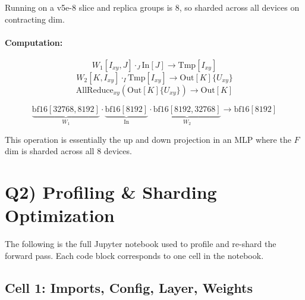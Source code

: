 \documentclass[11pt]{article}
\begin{document}
Running on a v5e-8 slice and replica groups is 8, so sharded across all devices on contracting dim.

\paragraph{Computation:}
\[
W_1[I_{xy}, J] \cdot_J \text{In}[J] \to \text{Tmp}[I_{xy}]
\]
\[
W_2[K, I_{xy}] \cdot_I \text{Tmp}[I_{xy}] \to \text{Out}[K]\{U_{xy}\}
\]
\[
\text{AllReduce}_{xy}(\text{Out}[K]\{U_{xy}\}) \to \text{Out}[K]
\]

\[
\underbrace{\text{bf16}[32768, 8192]}_{W_1} \cdot \underbrace{\text{bf16}[8192]}_{\text{In}} \cdot \underbrace{\text{bf16}[8192, 32768]}_{W_2} \to \text{bf16}[8192]
\]

This operation is essentially the up and down projection in an MLP where the $F$ dim is sharded across all 8 devices.

\section*{Q2) Profiling \& Sharding Optimization}

The following is the full Jupyter notebook used to profile and re-shard the forward pass. Each code block corresponds to one cell in the notebook.

\subsection*{Cell 1: Imports, Config, Layer, Weights}
\end{document}
